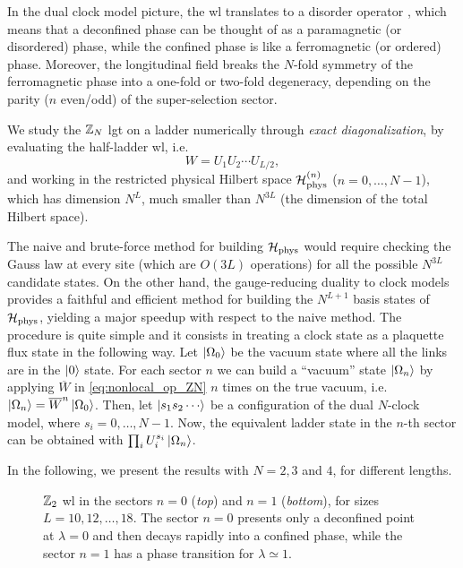 In the dual clock model picture, the \ac{wl} translates to a disorder operator \cite{fradkin1978order}, which means that a deconfined phase can be thought of as a paramagnetic (or disordered) phase, while the confined phase is like a ferromagnetic (or ordered) phase.
Moreover, the longitudinal field breaks the $N$-fold symmetry of the ferromagnetic phase into a one-fold or two-fold degeneracy, depending on the parity ($n$ even/odd) of the super-selection sector.

We study the $\mathbb{Z}_N$ \ac{lgt} on a ladder numerically through \emph{exact diagonalization}, by evaluating the half-ladder \ac{wl}, i.e.~
\begin{equation}
    W = U_1 U_2 \cdots U_{L/2},
\end{equation}
and working in the restricted physical Hilbert space $\mathcal{H}_{\text{phys}}^{(n)}$ ($n=0,\dots,N-1$), which has dimension $N^L$, much smaller than $N^{3L}$ (the dimension of the total Hilbert space).

The naive and brute-force method for building $\mathcal{H}_{\text{phys}}$ would require checking the Gauss law at every site (which are $O(3L)$ operations) for all the possible $N^{3L}$ candidate states.
On the other hand, the gauge-reducing duality to clock models provides a faithful and efficient method for building the $N^{L+1}$ basis states of $\mathcal{H}_{\text{phys}}$, yielding a major speedup with respect to the naive method.
The procedure is quite simple and it consists in treating a clock state as a plaquette flux state in the following way.
Let $\ket{\Omega_0}$ be the vacuum state where all the links are in the $\ket{0}$ state.
For each sector $n$ we can build a ``vacuum'' state $\ket{\Omega_n}$ by applying $\overline{W}$ in \eqref{eq:nonlocal_op_ZN} $n$ times on the true vacuum, i.e.~$\ket{\Omega_n} = \overline{W}^{n} \ket{\Omega_0}$.
Then, let $\ket{s_1 s_2 \cdots}$ be a configuration of the dual $N$-clock model, where $s_i = 0, \dots, N-1$.
Now, the equivalent ladder state in the $n$-th sector can be obtained with $\prod_{i} U_i^{s_i} \ket{\Omega_n}$.

In the following, we present the results with $N=2,3$ and $4$, for different lengths.



\begin{figure}[t]
    \centering
    
    \vspace*{-10pt}
    \caption[\ac{wl}s for the $\Z_2$ ladder \ac{lgt}]{$\Z_2$ \ac{wl} in the sectors $n=0$ (\emph{top}) and $n=1$ (\emph{bottom}), for sizes $L=10,12, \dots,18$.
    The sector $n=0$ presents only a deconfined point at $\lambda=0$ and then decays rapidly into a confined phase, while the sector $n=1$ has a phase transition for $\lambda \simeq 1$.
    }
    \label{fig:z2_wilson}
\end{figure}

